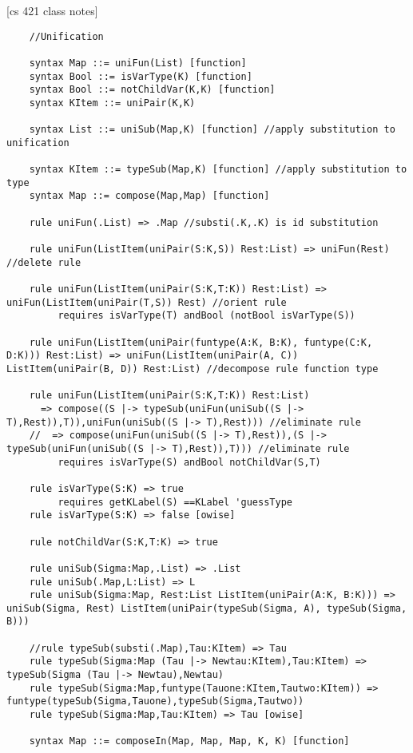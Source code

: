 [cs 421 class notes]
\begin{lstlisting}
    //Unification

    syntax Map ::= uniFun(List) [function]
    syntax Bool ::= isVarType(K) [function]
    syntax Bool ::= notChildVar(K,K) [function]
    syntax KItem ::= uniPair(K,K)

    syntax List ::= uniSub(Map,K) [function] //apply substitution to unification

    syntax KItem ::= typeSub(Map,K) [function] //apply substitution to type
    syntax Map ::= compose(Map,Map) [function]

    rule uniFun(.List) => .Map //substi(.K,.K) is id substitution

    rule uniFun(ListItem(uniPair(S:K,S)) Rest:List) => uniFun(Rest)  //delete rule

    rule uniFun(ListItem(uniPair(S:K,T:K)) Rest:List) => uniFun(ListItem(uniPair(T,S)) Rest) //orient rule
         requires isVarType(T) andBool (notBool isVarType(S))

    rule uniFun(ListItem(uniPair(funtype(A:K, B:K), funtype(C:K, D:K))) Rest:List) => uniFun(ListItem(uniPair(A, C)) ListItem(uniPair(B, D)) Rest:List) //decompose rule function type

    rule uniFun(ListItem(uniPair(S:K,T:K)) Rest:List) 
      => compose((S |-> typeSub(uniFun(uniSub((S |-> T),Rest)),T)),uniFun(uniSub((S |-> T),Rest))) //eliminate rule
    //  => compose(uniFun(uniSub((S |-> T),Rest)),(S |-> typeSub(uniFun(uniSub((S |-> T),Rest)),T))) //eliminate rule
         requires isVarType(S) andBool notChildVar(S,T)

    rule isVarType(S:K) => true
         requires getKLabel(S) ==KLabel 'guessType
    rule isVarType(S:K) => false [owise]

    rule notChildVar(S:K,T:K) => true

    rule uniSub(Sigma:Map,.List) => .List
    rule uniSub(.Map,L:List) => L
    rule uniSub(Sigma:Map, Rest:List ListItem(uniPair(A:K, B:K))) => uniSub(Sigma, Rest) ListItem(uniPair(typeSub(Sigma, A), typeSub(Sigma, B)))

    //rule typeSub(substi(.Map),Tau:KItem) => Tau
    rule typeSub(Sigma:Map (Tau |-> Newtau:KItem),Tau:KItem) => typeSub(Sigma (Tau |-> Newtau),Newtau)
    rule typeSub(Sigma:Map,funtype(Tauone:KItem,Tautwo:KItem)) => funtype(typeSub(Sigma,Tauone),typeSub(Sigma,Tautwo))
    rule typeSub(Sigma:Map,Tau:KItem) => Tau [owise]

    syntax Map ::= composeIn(Map, Map, Map, K, K) [function]


\end{lstlisting}
